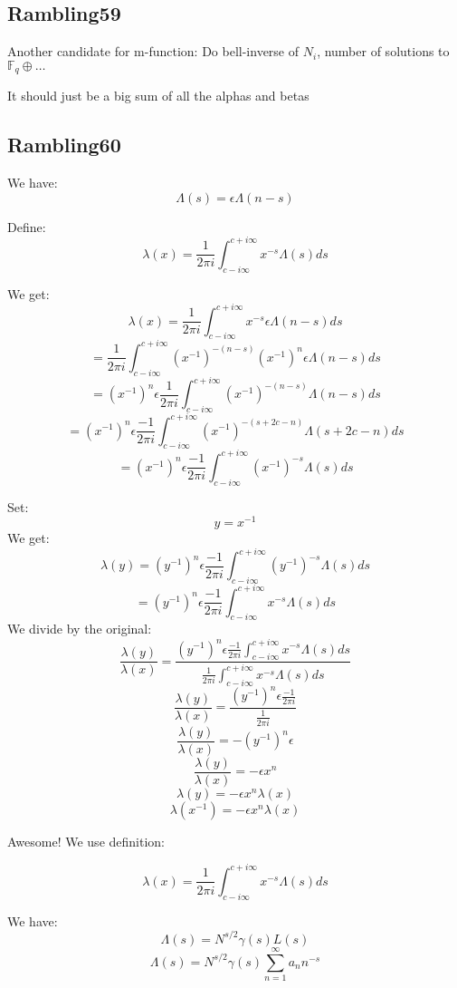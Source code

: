 \documentclass[a4paper]{amsart}
\begin{document}
\subsection{Rambling59}

Another candidate for m-function: Do bell-inverse of $N_i$, number of solutions to $\mathbb{F}_q \oplus \ldots$

It should just be a big sum of all the alphas and betas


\subsection{Rambling60}


We have: 
$$\Lambda(s) = \epsilon \Lambda(n - s)$$

Define: 
$$\lambda(x) = \frac{1}{2\pi i} \int_{c - i\infty}^{c + i\infty} x^{-s} \Lambda(s) ds$$

We get:
$$\lambda(x) = \frac{1}{2\pi i} \int_{c - i\infty}^{c + i\infty} x^{-s} \epsilon \Lambda(n - s) ds$$
$$ = \frac{1}{2\pi i} \int_{c - i\infty}^{c + i\infty} (x^{-1})^{-(n - s)} (x^{-1})^{n} \epsilon \Lambda(n - s) ds$$
$$ = (x^{-1})^{n} \epsilon \frac{1}{2\pi i} \int_{c - i\infty}^{c + i\infty} (x^{-1})^{-(n - s)} \Lambda(n - s) ds$$
$$ = (x^{-1})^{n} \epsilon \frac{-1}{2\pi i} \int_{c - i\infty}^{c + i\infty} (x^{-1})^{-(s + 2c - n)} \Lambda(s + 2c - n) ds$$
$$ = (x^{-1})^{n} \epsilon \frac{-1}{2\pi i} \int_{c - i\infty}^{c + i\infty} (x^{-1})^{-s} \Lambda(s) ds$$

Set:
$$y = x^{-1}$$
We get: 
$$\lambda(y) = (y^{-1})^{n} \epsilon \frac{-1}{2\pi i} \int_{c - i\infty}^{c + i\infty} (y^{-1})^{-s} \Lambda(s) ds$$
$$ = (y^{-1})^{n} \epsilon \frac{-1}{2\pi i} \int_{c - i\infty}^{c + i\infty} x^{-s} \Lambda(s) ds$$
We divide by the original:
$$\frac{\lambda(y)}{\lambda(x)} = \frac{(y^{-1})^{n} \epsilon \frac{-1}{2\pi i} \int_{c - i\infty}^{c + i\infty} x^{-s} \Lambda(s) ds}{\frac{1}{2\pi i} \int_{c - i\infty}^{c + i\infty} x^{-s} \Lambda(s) ds}$$
$$\frac{\lambda(y)}{\lambda(x)} = \frac{(y^{-1})^{n} \epsilon \frac{-1}{2\pi i}}{\frac{1}{2\pi i}}$$
$$\frac{\lambda(y)}{\lambda(x)} = -(y^{-1})^{n} \epsilon$$
$$\frac{\lambda(y)}{\lambda(x)} = -\epsilon x^{n}$$
$$\lambda(y) = -\epsilon x^{n} \lambda(x)$$
$$\lambda(x^{-1}) = -\epsilon x^{n} \lambda(x)$$

Awesome! We use definition:

$$\lambda(x) = \frac{1}{2\pi i} \int_{c - i\infty}^{c + i\infty} x^{-s} \Lambda(s) ds$$

We have: 
$$\Lambda(s) = N^{s/2} \gamma(s) L(s)$$
$$\Lambda(s) = N^{s/2} \gamma(s) \sum_{n = 1}^{\infty} a_n n^{-s}$$
\end{document}
